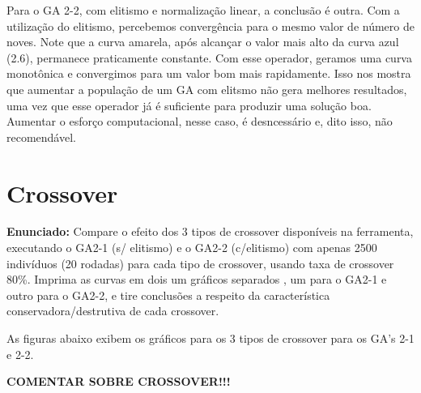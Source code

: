 \documentclass[12pt]{article}
\begin{document}
Para o GA 2-2, com elitismo e normalização linear, a conclusão é outra. Com a utilização do elitismo, percebemos convergência para o mesmo valor de número de noves. Note que a curva amarela, após alcançar o valor mais alto da curva azul (2.6), permanece praticamente constante. Com esse operador, geramos uma curva monotônica e convergimos para um valor bom mais rapidamente. Isso nos mostra que aumentar a população de um GA com elitsmo não gera melhores resultados, uma vez que esse operador já é suficiente para produzir uma solução boa. Aumentar o esforço computacional, nesse caso, é desncessário e, dito isso, não recomendável.

\section{Crossover}
\textbf{Enunciado:}
Compare o efeito dos 3 tipos de crossover disponíveis na ferramenta, executando o GA2-1 (s/ elitismo) e o GA2-2 (c/elitismo) com apenas 2500 indivíduos (20 rodadas) para cada tipo de crossover, usando taxa de crossover 80\%. Imprima as curvas em dois um gráficos separados , um para o GA2-1 e outro para o GA2-2, e tire conclusões a respeito da característica conservadora/destrutiva de cada crossover.

As figuras abaixo exibem os gráficos para os 3 tipos de crossover para os GA's 2-1 e 2-2.

\textbf{COMENTAR SOBRE CROSSOVER!!!}
\end{document}
